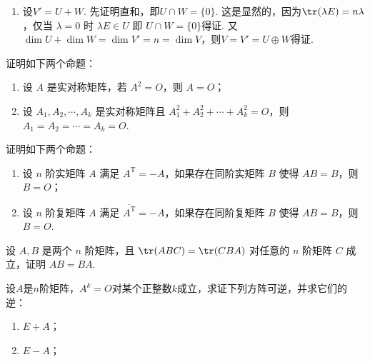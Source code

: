 \begin{exercise}
\begin{exgroup}
\begin{answer}
\begin{enumerate}
                \item 设$V'=U+W$. 先证明直和，即$U\cap W=\{0\}$. 这是显然的，因为$\tr(\lambda E)=n\lambda$，仅当 $\lambda=0$ 时 $\lambda E\in U$ 即 $U\cap W=\{0\}$得证. 又$\dim U+\dim W=\dim V'=n=\dim V$，则$V=V'=U\oplus W$得证.
            \end{enumerate}
        \end{answer}

        \item 证明如下两个命题：
        \begin{enumerate}
            \item 设 $A$ 是实对称矩阵，若 $A^2 = O$，则 $A = O$；
            \item 设 $A_1, A_2, \cdots, A_k$ 是实对称矩阵且 $A_1^2 + A_2^2 + \cdots + A_k^2 = O$，则 $A_1 = A_2 = \cdots = A_k = O$.
        \end{enumerate}
        \begin{answer}

        \end{answer}

        \item 证明如下两个命题：
        \begin{enumerate}
            \item 设 $n$ 阶实矩阵 $A$ 满足 $A^\mathrm{T} = -A$，如果存在同阶实矩阵 $B$ 使得 $AB = B$，则 $B = O$；
            \item 设 $n$ 阶复矩阵 $A$ 满足 $\overline{A^\mathrm{T}} = -A$，如果存在同阶复矩阵 $B$ 使得 $AB = B$，则 $B = O$.
        \end{enumerate}
        \begin{answer}

        \end{answer}

        \item 设 $A, B$ 是两个 $n$ 阶矩阵，且 $\tr(ABC) = \tr(CBA)$ 对任意的 $n$ 阶矩阵 $C$ 成立，证明 $AB = BA$.
        \begin{answer}

        \end{answer}

        \item 设$A$是$n$阶矩阵，$A^k=O$对某个正整数$k$成立，求证下列方阵可逆，并求它们的逆：
        \begin{enumerate}
            \item $E+A$；

            \item $E-A$；


\end{enumerate}
\end{exgroup}
\end{exercise}
